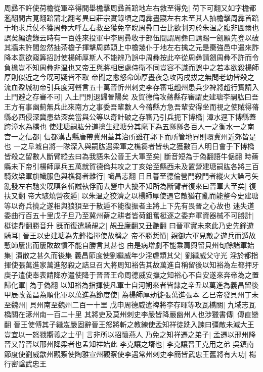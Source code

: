 周彞不許使荷檐從軍卒得間舉檐擊周彞首踣地左右救至得免|{
	荷下可翻又如字檐都濫翻間古莧翻踣蒲北翻考異曰莊宗實錄頃之周彞晝寢左右未至其人抽檐擊周彞首踣于地求兵仗不獲周彝大呼左右救至獲免卒睨周彞曰吾比欲剚刃於朱温之腹非圖爾也誤矣編遺錄云時有一百姓來投軍中李周彞收于部伍間謂周彝曰請賜一劒願先登以破其牆未許間忽然抽茶檐子揮擊周彞頭上中檐幾仆于地左右擒之元是棗強邑中遣來詐降本意欲窺筭招討使楊師厚斯人不能辨乃誤中周彝按此卒從周彝請劒周彝不許而令負檐豈不知周彝非温也又帝王與將相居處侍衛不同豈容不識而誤中之若本欲殺楊師厚則似近之今旣可疑皆不取}
帝聞之愈怒命師厚晝夜急攻丙戌拔之無問老幼皆殺之流血盈城初帝引兵度河聲言五十萬晉忻州刺史李存審屯趙州患兵少裨將趙行實請入土門避之存審不可|{
	入土門則退歸晉陽矣}
及賀德倫攻蓨縣存審謂史建瑭李嗣肱曰吾王方有事幽薊無兵此來南方之事委吾輩數人今蓨縣方急吾輩安得坐而視之使賊得蓨縣必西侵深冀患益深矣當與公等以奇計破之存審乃引兵扼下博橋|{
	漳水逕下博縣蓋跨漳水為橋也}
使建瑭嗣肱分道擒生建瑭分其麾下為五隊隊各百人一之衡水一之南宫一之信都|{
	信都漢古縣唐帶冀州蓋其治所雖在郭下而所管地界則環冀州近郊皆是也}
一之阜城自將一隊深入與嗣肱遇梁軍之樵芻者皆執之獲數百人明日會于下博橋皆殺之留數人斷臂縱去曰為我語朱公晉王大軍至矣|{
	斷音短為于偽翻語牛倨翻}
時蓨縣未下帝引楊師厚兵五萬就賀德倫共攻之丁亥始至縣西未及置營建瑭嗣肱各將三百騎效梁軍旗幟服色與樵芻者雜行|{
	幟昌志翻}
日且暮至德倫營門殺門者縱火大譟弓矢亂發左右馳突旣暝各斬馘執俘而去營中大擾不知所為斷臂者復來曰晉軍大至矣|{
	復扶又翻}
帝大駭燒營夜遁|{
	以朱温之狡濟之以楊師厚使遇它敵猶在亂而能整今史建瑭等以奇兵撓之遂相與狼狽至于散遁不能復振者主將上下先有畏晉之心故也}
迷失道委曲行百五十里戊子旦乃至冀州蓨之耕者皆荷鉏奮梃逐之委弃軍資器械不可勝計|{
	梃徒鼎翻勝音升}
旣而復遣騎覘之|{
	覘丑廉翻又丑艶翻}
曰晉軍實未來此乃史先鋒遊騎耳|{
	晉王以史建瑭為先鋒指揮使故稱之}
帝不勝慙憤|{
	親御六軍見敵之遊兵而遁故慙師屢出而屢敗故憤不能自勝言其甚也}
由是病增劇不能乘肩輿留貝州旬餘諸軍始集|{
	潰散之甚久而後集}
義昌節度使劉繼威年少淫虐類其父|{
	劉繼威父守光}
淫於都指揮使張萬進家萬進怒殺之詰旦召大將周知裕告其故萬進自稱留後以知裕為左都押牙庚子遣使奉表請降亦遣使降于晉晉王命周德威安撫之知裕心不自安遂來奔帝為之置歸化軍|{
	為于偽翻}
以知裕為指揮使凡軍士自河朔來者皆隸之辛丑以萬進為義昌留後甲辰改義昌為順化軍以萬進為節度使|{
	為楊師厚劫徙張萬進張本}
乙巳帝發貝州丁未至魏州|{
	貝州南至魏州二百一十里}
戊申周德威遣禆將李存暉等攻瓦橋關|{
	九域志瓦橋關在涿州南一百二十里}
其將吏及莫州刺史李嚴皆降嚴幽州人也涉獵書傳|{
	傳直戀翻}
晉王使傅其子繼岌嚴固辭晉王怒將斬之教練使孟知祥徒跣入諫曰彊敵未滅大王豈宜以一怒戮嚮義之士乎|{
	言非所以招懷燕人}
乃免之知祥遷之弟子|{
	孟遷以邢州降晉又背晉以邢州降梁者也孟知祥始此}
李克讓之壻也|{
	李克讓晉王克用之弟}
吳鎮南節度使劉威歙州觀察使陶雅宣州觀察使李遇常州刺史李簡皆武忠王舊將有大功|{
	楊行密諡武忠王}
